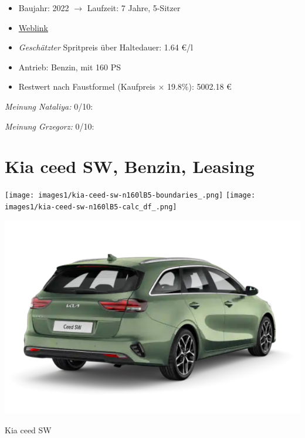 \documentclass[landscape, DIV=99, 14pt]{scrartcl}
\begin{document}
\begin{itemize}
    \item Baujahr: 2022 $\rightarrow$ Laufzeit: 7 Jahre, 5-Sitzer
    \item \href{https://konfigurator.meinauto.de/kia/neuwagen/cee-d/angebote/cee-d-sporty-wagon/konfigurator/\#!/extras/spirit/8865371/3,11,27/private/109347-4167-291321/1321/61d21ce73c5db/cash-purchase/109348-8088-291322/48,0,10000,0,0,0,0,0,}{Weblink}
    \item \emph{Gesch\"atzter} Spritpreis \"uber Haltedauer: 1.64 \euro{}/l
    \item Antrieb: Benzin, mit 160 PS
    \item Restwert nach Faustformel (Kaufpreis $\times$ 19.8\%): 5002.18 \euro{}
\end{itemize}

\begin{small}
\emph{Meinung Nataliya:} 0/10: 
        
\emph{Meinung Grzegorz:} 0/10: 
\end{small}

\pagebreak


\twocolumn

\section*{Kia ceed SW, Benzin, Leasing}
\begin{center}
\texttt{[image: images1/kia-ceed-sw-n160lB5-boundaries\_.png]}
\null
\vspace{0.5cm}
\texttt{[image: images1/kia-ceed-sw-n160lB5-calc\_df\_.png]}
\end{center}

\pagebreak
\begin{center}
\includegraphics[width=0.9\columnwidth]{cars/kia-ceed-sportswagon-leasing.png}

Kia ceed SW
\end{center}
\end{document}
